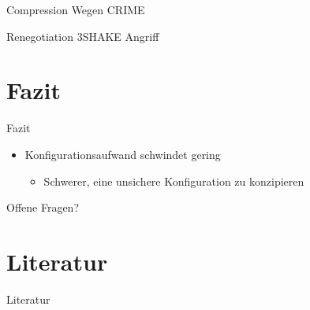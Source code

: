 \documentclass{f4_beamer_metropolis}
\begin{document}
\begin{frame}{Compression}
Wegen CRIME
\end{frame}

\begin{frame}{Renegotiation}
3SHAKE Angriff
\end{frame}

\section{Fazit}

\begin{frame}{Fazit}
\begin{itemize}
  \item Konfigurationsaufwand schwindet gering
  \begin{itemize}
    \item Schwerer, eine unsichere Konfiguration zu konzipieren
  \end{itemize}
\end{itemize}
\end{frame}

\begin{frame}[standout]
  Offene Fragen?
\end{frame}

\section{Literatur}

\begin{frame}[allowframebreaks]{Literatur}
  \printbibliography
\end{frame}
\end{document}
